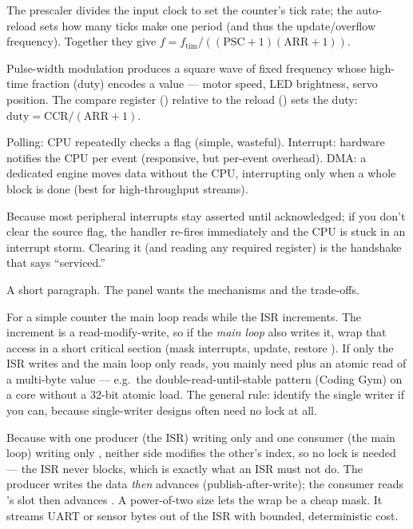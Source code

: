 The prescaler divides the input clock to set the counter's tick rate; the
auto-reload sets how many ticks make one period (and thus the update/overflow
frequency). Together they give
$f = f_{\text{tim}} / ((\text{PSC}+1)(\text{ARR}+1))$.

Pulse-width modulation produces a square wave of fixed frequency whose
high-time fraction (duty) encodes a value --- motor speed, LED brightness,
servo position. The compare register () relative to the reload
() sets the duty: $\text{duty}=\text{CCR}/(\text{ARR}+1)$.

Polling: CPU repeatedly checks a flag (simple, wasteful). Interrupt: hardware
notifies the CPU per event (responsive, but per-event overhead). DMA: a
dedicated engine moves data without the CPU, interrupting only when a whole
block is done (best for high-throughput streams).

Because most peripheral interrupts stay asserted until acknowledged; if you
don't clear the source flag, the handler re-fires immediately and the CPU is
stuck in an interrupt storm. Clearing it (and reading any required register) is
the handshake that says ``serviced.''

%
{A short paragraph. The panel wants the mechanisms and the trade-offs.}

For a simple counter the main loop reads while the ISR increments. The
increment  is a read-modify-write, so if the \emph{main loop}
also writes it, wrap that access in a short critical section (mask interrupts,
update, restore ). If only the ISR writes and the main loop only
reads, you mainly need  plus an atomic read of a multi-byte
value --- e.g.\ the double-read-until-stable pattern (Coding Gym) on a core
without a 32-bit atomic load. The general rule: identify the single writer if
you can, because single-writer designs often need no lock at all.

Because with one producer (the ISR) writing only  and one consumer
(the main loop) writing only , neither side modifies the other's
index, so no lock is needed --- the ISR never blocks, which is exactly what an
ISR must not do. The producer writes the data \emph{then} advances 
(publish-after-write); the consumer reads 's slot then advances
. A power-of-two size lets the wrap be a cheap mask. It streams UART
or sensor bytes out of the ISR with bounded, deterministic cost.

